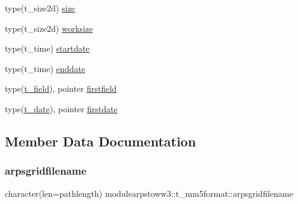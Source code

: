 \begin{DoxyCompactItemize}
\item 
type(t\+\_\+size2d) \mbox{\hyperlink{structmodulearpstoww3_1_1t__mm5format_a2801b6e708f62aa93049ce94e1f81a7c}{size}}
\item 
type(t\+\_\+size2d) \mbox{\hyperlink{structmodulearpstoww3_1_1t__mm5format_a495051afd44d12581beb967054fea94a}{worksize}}
\item 
type(t\+\_\+time) \mbox{\hyperlink{structmodulearpstoww3_1_1t__mm5format_a16414f008c68d87c03db59c9e6804ec4}{startdate}}
\item 
type(t\+\_\+time) \mbox{\hyperlink{structmodulearpstoww3_1_1t__mm5format_ab84af4b77c7ea57ab7fd9c1886babc26}{enddate}}
\item 
type(\mbox{\hyperlink{structmodulearpstoww3_1_1t__field}{t\+\_\+field}}), pointer \mbox{\hyperlink{structmodulearpstoww3_1_1t__mm5format_a6fd59f527d45b599f549f99218d7e3fd}{firstfield}}
\item 
type(\mbox{\hyperlink{structmodulearpstoww3_1_1t__date}{t\+\_\+date}}), pointer \mbox{\hyperlink{structmodulearpstoww3_1_1t__mm5format_a0c7ae3f7e49879739de8d49f9efe1198}{firstdate}}
\end{DoxyCompactItemize}


\subsection{Member Data Documentation}
\mbox{\label{structmodulearpstoww3_1_1t__mm5format_aae9eb44ff00aec14426a4d2ca8d127a9}} 
\subsubsection{\texorpdfstring{arpsgridfilename}{arpsgridfilename}}
{\footnotesize\ttfamily character(len=pathlength) modulearpstoww3\+::t\+\_\+mm5format\+::arpsgridfilename\hspace{0.3cm}{\ttfamily [private]}}

\mbox{\label{structmodulearpstoww3_1_1t__mm5format_abcef9c5d3e1abd22287eba7fbec34fba}} 
